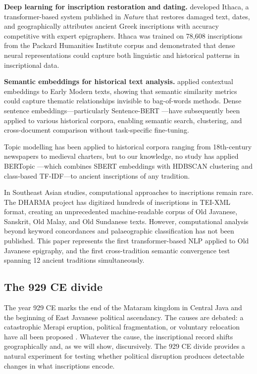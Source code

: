 \documentclass[12pt]{article}
\begin{document}
\textbf{Deep learning for inscription restoration and dating.}
\citet{Assael2022} developed Ithaca, a transformer-based system published in \textit{Nature} that restores damaged text, dates, and geographically attributes ancient Greek inscriptions with accuracy competitive with expert epigraphers.
Ithaca was trained on 78,608 inscriptions from the Packard Humanities Institute corpus and demonstrated that dense neural representations could capture both linguistic and historical patterns in inscriptional data.

\textbf{Semantic embeddings for historical text analysis.}
\citet{Manjavacas2019} applied contextual embeddings to Early Modern texts, showing that semantic similarity metrics could capture thematic relationships invisible to bag-of-words methods.
Dense sentence embeddings---particularly Sentence-BERT \citep{Reimers2019}---have subsequently been applied to various historical corpora, enabling semantic search, clustering, and cross-document comparison without task-specific fine-tuning.

Topic modelling has been applied to historical corpora ranging from 18th-century newspapers \citep{Blei2003} to medieval charters, but to our knowledge, no study has applied BERTopic \citep{Grootendorst2022}---which combines SBERT embeddings with HDBSCAN clustering and class-based TF-IDF---to ancient inscriptions of any tradition.

In Southeast Asian studies, computational approaches to inscriptions remain rare.
The DHARMA project \citep{DHARMA2024} has digitized hundreds of inscriptions in TEI-XML format, creating an unprecedented machine-readable corpus of Old Javanese, Sanskrit, Old Malay, and Old Sundanese texts.
However, computational analysis beyond keyword concordances and palaeographic classification has not been published.
This paper represents the first transformer-based NLP applied to Old Javanese epigraphy, and the first cross-tradition semantic convergence test spanning 12 ancient traditions simultaneously.

\subsection{The 929 CE divide}

The year 929 CE marks the end of the Mataram kingdom in Central Java and the beginning of East Javanese political ascendancy.
The causes are debated: a catastrophic Merapi eruption, political fragmentation, or voluntary relocation have all been proposed \citep{Degroot2009}.
Whatever the cause, the inscriptional record shifts geographically and, as we will show, discursively.
The 929 CE divide provides a natural experiment for testing whether political disruption produces detectable changes in what inscriptions encode.
\end{document}

